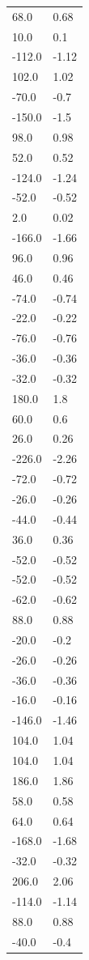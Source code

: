 \begin{longtable}{ll}
68.0 & 0.68 \\
10.0 & 0.1 \\
-112.0 & -1.12 \\
102.0 & 1.02 \\
-70.0 & -0.7 \\
-150.0 & -1.5 \\
98.0 & 0.98 \\
52.0 & 0.52 \\
-124.0 & -1.24 \\
-52.0 & -0.52 \\
2.0 & 0.02 \\
-166.0 & -1.66 \\
96.0 & 0.96 \\
46.0 & 0.46 \\
-74.0 & -0.74 \\
-22.0 & -0.22 \\
-76.0 & -0.76 \\
-36.0 & -0.36 \\
-32.0 & -0.32 \\
180.0 & 1.8 \\
60.0 & 0.6 \\
26.0 & 0.26 \\
-226.0 & -2.26 \\
-72.0 & -0.72 \\
-26.0 & -0.26 \\
-44.0 & -0.44 \\
36.0 & 0.36 \\
-52.0 & -0.52 \\
-52.0 & -0.52 \\
-62.0 & -0.62 \\
88.0 & 0.88 \\
-20.0 & -0.2 \\
-26.0 & -0.26 \\
-36.0 & -0.36 \\
-16.0 & -0.16 \\
-146.0 & -1.46 \\
104.0 & 1.04 \\
104.0 & 1.04 \\
186.0 & 1.86 \\
58.0 & 0.58 \\
64.0 & 0.64 \\
-168.0 & -1.68 \\
-32.0 & -0.32 \\
206.0 & 2.06 \\
-114.0 & -1.14 \\
88.0 & 0.88 \\
-40.0 & -0.4 \\

\end{longtable}
